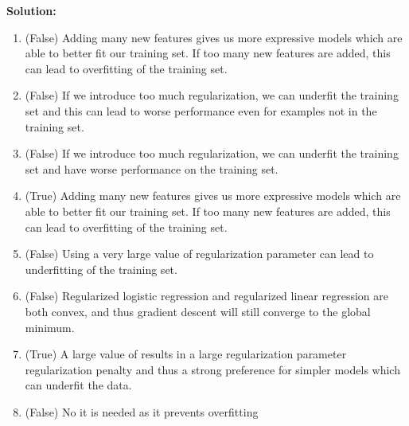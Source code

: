 \documentclass[12pt]{article}
\begin{document}
	\begin{framed}
		\textbf{Solution:}\\
		\begin{enumerate}
			\item (False) Adding many new features gives us more expressive models which are able to better fit our training set. If too many new features are added, this can lead to overfitting of the training set.
			\item (False) If we introduce too much regularization, we can underfit the training set and this can lead to worse performance even for examples not in the training set.
			\item (False) If we introduce too much regularization, we can underfit the training set and have worse performance on the training set.
			\item (True) Adding many new features gives us more expressive models which are able to better fit our training set. If too many new features are added, this can lead to overfitting of the training set.
			\item (False) Using a very large value of regularization parameter can lead to underfitting of the training set.
			\item (False) Regularized logistic regression and regularized linear regression are both convex, and thus gradient descent will still converge to the global minimum.
			\item (True) A large value of results in a large regularization parameter regularization penalty and thus a strong preference for simpler models which can underfit the data.
			\item (False) No it is needed as it prevents overfitting
		\end{enumerate}
	\end{framed}
	
	
\end{document}
